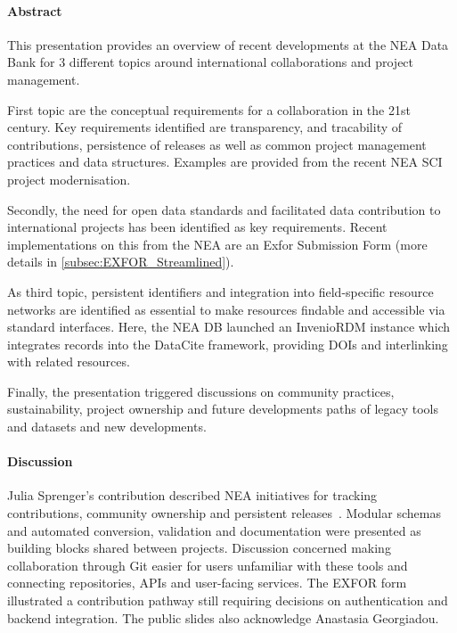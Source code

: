 \paragraph{Abstract}
This presentation provides an overview of recent developments at the NEA Data Bank for 3 different topics around international collaborations and project management.

First topic are the conceptual requirements for a collaboration in the 21st century. Key requirements identified are transparency, and tracability of contributions, persistence of releases as well as common project management practices and data structures. Examples are provided from the recent NEA SCI project modernisation.

Secondly, the need for open data standards and facilitated data contribution to international projects has been identified as key requirements. Recent implementations on this from the NEA are an Exfor Submission Form (more details in \ref{subsec:EXFOR_Streamlined}).  

As third topic, persistent identifiers and integration into field-specific resource networks are identified as essential to make resources findable and accessible via standard interfaces. Here, the NEA DB launched an InvenioRDM instance which integrates records into the DataCite framework, providing DOIs and interlinking with related resources.

Finally, the presentation triggered discussions on community practices, sustainability, project ownership and future developments paths of legacy tools and datasets and new developments.

\mbox{}\par

\paragraph{Discussion}
Julia Sprenger's contribution described NEA initiatives for tracking contributions, community ownership and persistent releases~\cite{neaSlides}. Modular schemas and automated conversion, validation and documentation were presented as building blocks shared between projects. Discussion concerned making collaboration through Git easier for users unfamiliar with these tools and connecting repositories, APIs and user-facing services. The EXFOR form illustrated a contribution pathway still requiring decisions on authentication and backend integration. The public slides also acknowledge Anastasia Georgiadou.
